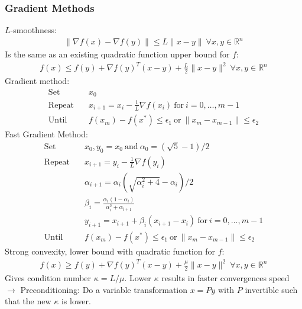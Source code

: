 \documentclass[a4paper,landscape,8pt,fleqn]{scrartcl}
\newcommand{\mb}[1]{\mathbb{#1}}
\begin{document}
\begin{multicols}{3}
\subsubsection{Gradient Methods}
$L$-smoothness:
\begin{align*}
	\| \nabla f(x) - \nabla f(y) \| \leq L \| x - y \| ~\forall x,y \in \mb{R}^n
\end{align*}
Is the same as an existing quadratic function upper bound for $f$:
\begin{align*}
	f(x) \leq f(y) + \nabla f(y)^T (x-y) + \frac{L}{2} \| x-y \|^2 ~\forall x,y \in \mb{R}^n
\end{align*}
Gradient method:
\begin{align*}
	\mathrm{Set} \quad & x_0 \\
	\mathrm{Repeat} \quad & x_{i+1} = x_i - \frac{1}{L} \nabla f(x_i) ~\mathrm{for~} i=0,\dots,m-1 \\
	\mathrm{Until} \quad & f(x_m) - f(x^*) \leq \epsilon_1 \mathrm{~or~} \|x_m - x_{m-1} \| \leq \epsilon_2
\end{align*}
Fast Gradient Method:
\begin{align*}
	\mathrm{Set} \quad & x_0, y_0 = x_0 \mathrm{~and~} \alpha_0 =(\sqrt{5}-1)/2 \\
	\mathrm{Repeat} \quad & x_{i+1} = y_i - \frac{1}{L} \nabla f(y_i) \\
	&\alpha_{i+1} = \alpha_i \left( \sqrt{\alpha^2_i + 4} - \alpha_i \right)/2 \\
	&\beta_i = \frac{\alpha_i (1 - \alpha_i)}{\alpha^2_i + \alpha_{i+1}} \\
	&y_{i+1} = x_{i+1} + \beta_i (x_{i+1} - x_i  )  ~\mathrm{for~} i=0,\dots,m-1 \\
	\mathrm{Until} \quad & f(x_m) - f(x^*) \leq \epsilon_1 \mathrm{~or~} \|x_m - x_{m-1} \| \leq \epsilon_2
\end{align*}
Strong convexity, lower bound with quadratic function for $f$:
\begin{align*}
	f(x) \geq f(y) + \nabla f(y)^T (x-y) + \frac{\mu}{2} \| x-y \|^2 ~\forall x,y \in \mb{R}^n
\end{align*}
Gives condition number $\kappa = L/\mu$. Lower $\kappa$ results in faster convergences speed $\rightarrow$ Preconditioning: Do a variable transformation $x = Py$ with $P$ invertible such that the new $\kappa$ is lower.

\end{multicols}
\end{document}
